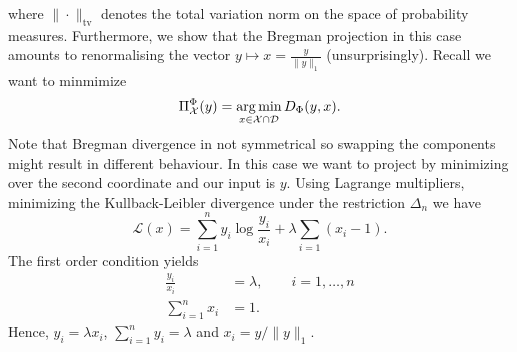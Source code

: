 where $\|\cdot\|_\mathrm{tv}$ denotes the total variation norm on the space of probability measures. Furthermore, we show that the Bregman projection in this case amounts to renormalising the vector $y \mapsto x = \frac{y}{\|y\|_1}$ (unsurprisingly). 
Recall we want to minmimize 
\begin{equation*}
	\Pi_\mathcal{X}^\Phi(y) = \operatorname*{arg\,min}_{x\in \mathcal{X}\cap\mathcal{D}} D_\Phi(y, x).
\end{equation*}
Note that Bregman divergence in not symmetrical so swapping the components might result in different behaviour. In this case we want to project by minimizing over the second coordinate and our input is $y$.
Using Lagrange multipliers, minimizing the Kullback-Leibler divergence under the restriction $\Delta_n$ we have 
\begin{equation*}
	\mathcal{L}(x) = \sum_{i=1}^n y_i \log \frac{y_i}{x_i} + \lambda \sum_{i=1}\left(x_i - 1\right).
\end{equation*}
The first order condition yields
\begin{align*}
		\frac{y_i}{x_i} &= \lambda, \qquad i=1, \ldots,n \\
	\sum_{i=1}^n x_i	&= 1.
\end{align*}
Hence, $y_i = \lambda x_i$, $\sum_{i=1}^n y_i = \lambda$ and $x_i = y/\|y\|_1$.

